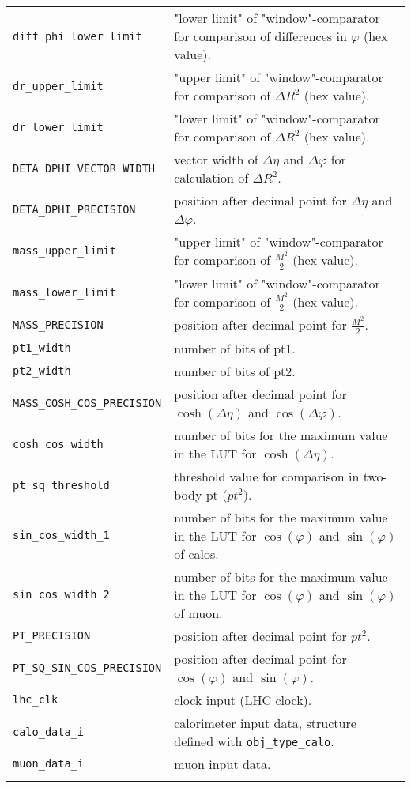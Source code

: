 \begin{longtable}{>{\footnotesize}l >{\footnotesize}p{}}
\verb|diff_phi_lower_limit| & "lower limit" of "window"-comparator for comparison of differences in $\varphi$ (hex value).\\
\verb|dr_upper_limit| & "upper limit" of "window"-comparator for comparison of $\Delta$$R^2$ (hex value).\\
\verb|dr_lower_limit| & "lower limit" of "window"-comparator for comparison of $\Delta$$R^2$ (hex value).\\
\verb|DETA_DPHI_VECTOR_WIDTH| & vector width of $\Delta\eta$ and $\Delta\varphi$ for calculation of $\Delta$$R^2$.\\
\verb|DETA_DPHI_PRECISION| & position after decimal point for $\Delta\eta$ and $\Delta\varphi$.\\
\verb|mass_upper_limit| & "upper limit" of "window"-comparator for comparison of $\frac{M^2}{2}$ (hex value).\\
\verb|mass_lower_limit| & "lower limit" of "window"-comparator for comparison of $\frac{M^2}{2}$ (hex value).\\
\verb|MASS_PRECISION| & position after decimal point for $\frac{M^2}{2}$.\\
\verb|pt1_width| & number of bits of pt1.\\
\verb|pt2_width| & number of bits of pt2.\\
\verb|MASS_COSH_COS_PRECISION| & position after decimal point for $\cosh(\Delta\eta)$ and $\cos(\Delta\varphi)$.\\
\verb|cosh_cos_width| & number of bits for the maximum value in the LUT for $\cosh(\Delta\eta)$.\\
\verb|pt_sq_threshold| & threshold value for comparison in two-body pt (${pt^2}$).\\
\verb|sin_cos_width_1| & number of bits for the maximum value in the LUT for $\cos(\varphi)$ and $\sin(\varphi)$ of calos.\\
\verb|sin_cos_width_2| & number of bits for the maximum value in the LUT for $\cos(\varphi)$ and $\sin(\varphi)$ of muon.\\
\verb|PT_PRECISION| & position after decimal point for ${pt^2}$.\\
\verb|PT_SQ_SIN_COS_PRECISION| & position after decimal point for $\cos(\varphi)$ and $\sin(\varphi)$.\\
\verb|lhc_clk| & clock input (LHC clock).\\
\verb|calo_data_i| & calorimeter input data, structure defined with \texttt{obj\_type\_calo}.\\
\verb|muon_data_i| & muon input data.\\
$$
\end{longtable}
